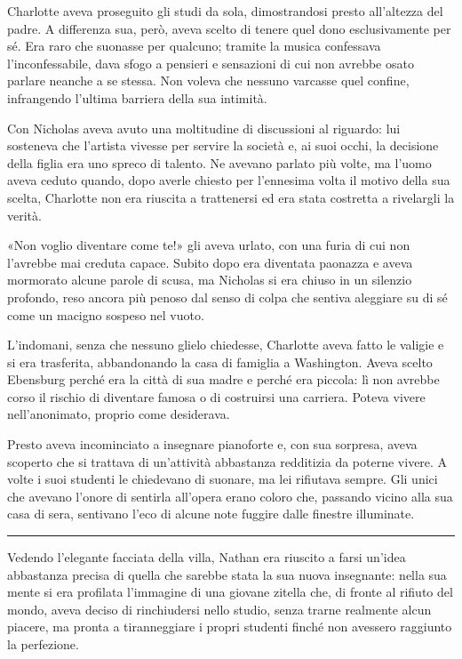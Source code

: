 \documentclass[a4paper,oneside,11pt]{memoir}
\begin{document}
Charlotte aveva proseguito gli studi da sola, dimostrandosi presto all'altezza
del padre. A differenza sua, però, aveva scelto di tenere quel dono
esclusivamente per sé. Era raro che suonasse per qualcuno; tramite la musica
confessava l'inconfessabile, dava sfogo a pensieri e sensazioni di cui non
avrebbe osato parlare neanche a se stessa. Non voleva che nessuno varcasse quel
confine, infrangendo l'ultima barriera della sua intimità.

Con Nicholas aveva avuto una moltitudine di discussioni al riguardo: lui
sosteneva che l'artista vivesse per servire la società e, ai suoi occhi, la
decisione della figlia era uno spreco di talento. Ne avevano parlato più volte,
ma l'uomo aveva ceduto quando, dopo averle chiesto per l'ennesima volta il
motivo della sua scelta, Charlotte non era riuscita a trattenersi ed era stata
costretta a rivelargli la verità.

«Non voglio diventare come te!» gli aveva urlato, con una furia di cui non
l'avrebbe mai creduta capace. Subito dopo era diventata paonazza e aveva
mormorato alcune parole di scusa, ma Nicholas si era chiuso in un silenzio
profondo, reso ancora più penoso dal senso di colpa che sentiva aleggiare su di
sé come un macigno sospeso nel vuoto.

L'indomani, senza che nessuno glielo chiedesse, Charlotte aveva fatto le valigie
e si era trasferita, abbandonando la casa di famiglia a Washington. Aveva scelto
Ebensburg perché era la città di sua madre e perché era piccola: lì non avrebbe
corso il rischio di diventare famosa o di costruirsi una carriera. Poteva vivere
nell'anonimato, proprio come desiderava.

Presto aveva incominciato a insegnare pianoforte e, con sua sorpresa, aveva
scoperto che si trattava di un'attività abbastanza redditizia da poterne vivere.
A volte i suoi studenti le chiedevano di suonare, ma lei rifiutava sempre. Gli
unici che avevano l'onore di sentirla all'opera erano coloro che, passando
vicino alla sua casa di sera, sentivano l'eco di alcune note fuggire dalle
finestre illuminate.

\plainbreak{1}

Vedendo l'elegante facciata della villa, Nathan era riuscito a farsi un'idea
abbastanza precisa di quella che sarebbe stata la sua nuova insegnante: nella
sua mente si era profilata l'immagine di una giovane zitella che, di fronte al
rifiuto del mondo, aveva deciso di rinchiudersi nello studio, senza trarne
realmente alcun piacere, ma pronta a tiranneggiare i propri studenti finché non
avessero raggiunto la perfezione.
\end{document}
